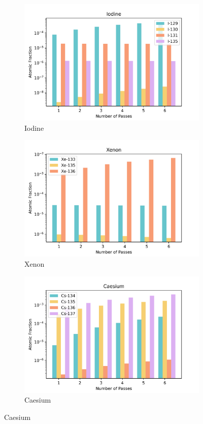 \begin{figure}[h!]
\centering
%
\begin{subfigure}{0.25\textwidth}
  \includegraphics[width=0.95\linewidth]{figures/compositions/iodine}
  \caption{Iodine}
  \label{fig:i}
\end{subfigure}%
%
\begin{subfigure}{0.25\textwidth}
  \includegraphics[width=0.95\linewidth]{figures/compositions/xenon}
  \caption{Xenon}
  \label{fig:xe}
\end{subfigure}%
%
\begin{subfigure}{0.25\textwidth}
  \includegraphics[width=0.95\linewidth]{figures/compositions/caesium}
  \caption{Caesium}
  \label{fig:cs}
\end{subfigure}%


\end{figure}
